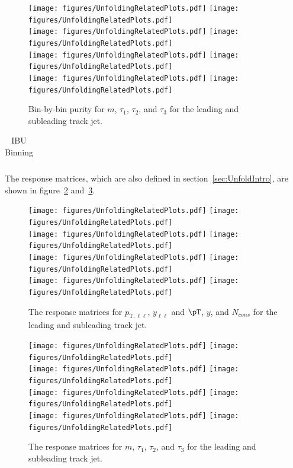 \begin{figure}[h!]
  \centering
  \texttt{[image: figures/UnfoldingRelatedPlots.pdf]}
  \texttt{[image: figures/UnfoldingRelatedPlots.pdf]} \\
  \texttt{[image: figures/UnfoldingRelatedPlots.pdf]}
  \texttt{[image: figures/UnfoldingRelatedPlots.pdf]} \\
  \texttt{[image: figures/UnfoldingRelatedPlots.pdf]}
  \texttt{[image: figures/UnfoldingRelatedPlots.pdf]} \\
  \texttt{[image: figures/UnfoldingRelatedPlots.pdf]}
  \texttt{[image: figures/UnfoldingRelatedPlots.pdf]}
  \caption{Bin-by-bin purity for $m$, $\tau_1$, $\tau_2$, and $\tau_3$ for the leading and subleading track jet.}
  \label{fig:binPur2}
\end{figure}

\begin{table}[h!]
    \centering
    \begin{tabular}{l|l|l|l|l|l|l}
    \hline\hline
    
    \end{tabular}
    \caption{IBU Binning}
    \label{tab:IBUBins}
\end{table}

The response matrices, which are also defined in section~\ref{sec:UnfoldIntro}, are shown in figure~\ref{fig:migMat1} and~\ref{fig:migMat2}.

\begin{figure}[h!]
  \centering
  \texttt{[image: figures/UnfoldingRelatedPlots.pdf]}
  \texttt{[image: figures/UnfoldingRelatedPlots.pdf]} \\
  \texttt{[image: figures/UnfoldingRelatedPlots.pdf]}
  \texttt{[image: figures/UnfoldingRelatedPlots.pdf]} \\
  \texttt{[image: figures/UnfoldingRelatedPlots.pdf]}
  \texttt{[image: figures/UnfoldingRelatedPlots.pdf]} \\
  \texttt{[image: figures/UnfoldingRelatedPlots.pdf]}
  \texttt{[image: figures/UnfoldingRelatedPlots.pdf]}
  \caption{The response matrices for $p_{\text{T},\ell\ell}$, $y_{\ell\ell}$ and $\pT$, $y$, and $N_{cons}$ for the leading and subleading track jet.}
  \label{fig:migMat1}
\end{figure}

\begin{figure}[h!]
  \centering
  \texttt{[image: figures/UnfoldingRelatedPlots.pdf]}
  \texttt{[image: figures/UnfoldingRelatedPlots.pdf]} \\
  \texttt{[image: figures/UnfoldingRelatedPlots.pdf]}
  \texttt{[image: figures/UnfoldingRelatedPlots.pdf]} \\
  \texttt{[image: figures/UnfoldingRelatedPlots.pdf]}
  \texttt{[image: figures/UnfoldingRelatedPlots.pdf]} \\
  \texttt{[image: figures/UnfoldingRelatedPlots.pdf]}
  \texttt{[image: figures/UnfoldingRelatedPlots.pdf]}
  \caption{The response matrices for $m$, $\tau_1$, $\tau_2$, and $\tau_3$ for the leading and subleading track jet.}
  \label{fig:migMat2}
\end{figure}

